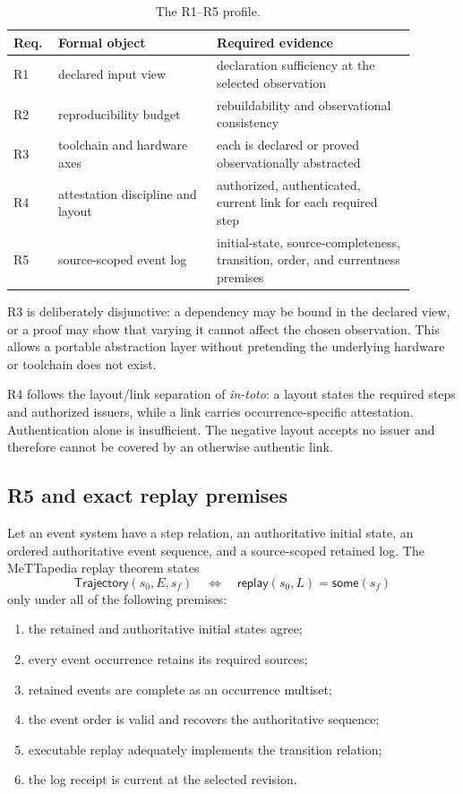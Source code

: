 \documentclass[11pt]{article}
\begin{document}
\begin{table}[ht]
\centering
\small
\begin{tabular}{@{}p{0.08\linewidth}p{0.36\linewidth}p{0.45\linewidth}@{}}
\toprule
Req. & Formal object & Required evidence \\
\midrule
R1 & declared input view & declaration sufficiency at the selected observation \\
R2 & reproducibility budget & rebuildability and observational consistency \\
R3 & toolchain and hardware axes & each is declared or proved observationally abstracted \\
R4 & attestation discipline and layout & authorized, authenticated, current link for each required step \\
R5 & source-scoped event log & initial-state, source-completeness, transition, order, and currentness premises \\
\bottomrule
\end{tabular}
\caption{The R1--R5 profile.}
\label{tab:r1r5}
\end{table}

R3 is deliberately disjunctive: a dependency may be bound in the declared
view, or a proof may show that varying it cannot affect the chosen observation.
This allows a portable abstraction layer without pretending the underlying
hardware or toolchain does not exist.

R4 follows the layout/link separation of \emph{in-toto}: a layout states the
required steps and authorized issuers, while a link carries occurrence-specific
attestation.  Authentication alone is insufficient.  The negative layout
accepts no issuer and therefore cannot be covered by an otherwise authentic
link.

\subsection{R5 and exact replay premises}

Let an event system have a step relation, an authoritative initial state, an
ordered authoritative event sequence, and a source-scoped retained log.  The
MeTTapedia replay theorem states
\[
  \mathsf{Trajectory}(s_0,E,s_f)
  \quad\Longleftrightarrow\quad
  \mathsf{replay}(s_0,L)=\mathsf{some}(s_f)
\]
only under all of the following premises:

\begin{enumerate}
  \item the retained and authoritative initial states agree;
  \item every event occurrence retains its required sources;
  \item retained events are complete as an occurrence multiset;
  \item the event order is valid and recovers the authoritative sequence;
  \item executable replay adequately implements the transition relation;
  \item the log receipt is current at the selected revision.
\end{enumerate}
\end{document}
